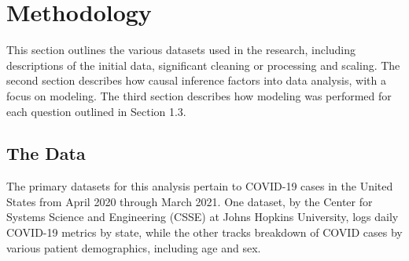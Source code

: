 \documentclass[11pt]{article}
\begin{document}


\section{Methodology}


This section outlines the various datasets used in the research, including descriptions of the initial data, significant cleaning or processing and scaling. The second section describes how causal inference factors into data analysis, with a focus on modeling. The third section describes how modeling was performed for each question outlined in Section 1.3.


\subsection{The Data}

The primary datasets for this analysis pertain to COVID-19 cases in the United States from April 2020 through March 2021.  One dataset, by the Center for Systems Science and Engineering (CSSE) at Johns Hopkins University, logs daily COVID-19 metrics by state, while the other tracks breakdown of COVID cases by various patient demographics, including age and sex. 
\end{document}
